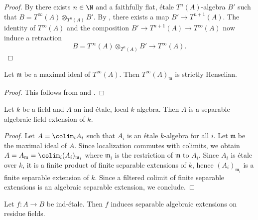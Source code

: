 \begin{proof}
    \leanok
    By 
    there exists $n \in \N$ and a faithfully flat, étale $T^n(A)$-algebra $B'$ such that
    $B = T^{\infty}(A) \otimes_{T^n(A)} B'$. By ,
    there exists a map $B' \to T^{n+1}(A)$. The identity of $T^{\infty}(A)$ and the composition
    $B' \to T^{n+1}(A) \to T^{\infty}(A)$ now induce a retraction
    \[
    B = T^{\infty}(A) \otimes_{T^n(A)} B' \to T^{\infty}(A)
    .\]
\end{proof}

\begin{corollary}
    Let $\mathfrak{m}$ be a maximal ideal of $T^{\infty}(A)$. Then $T^{\infty}(A)_{\mathfrak{m}}$
    is strictly Henselian.
    \label{cor:strictly-henselian-etale-contraction}
\end{corollary}

\begin{proof}
    This follows from  and .
\end{proof}

\begin{lemma}
    Let $k$ be a field and $A$ an ind-étale, local $k$-algebra. Then $A$ is
    a separable algebraic field extension of $k$.
    \label{lemma:field-local-ind-etale}
    \leanok
\end{lemma}

\begin{proof}
    \leanok
    Let $A = \colim_i A_i$ such that $A_i$ is an étale $k$-algebra for all $i$.
    Let $\mathfrak{m}$ be the maximal ideal of $A$. Since localization commutes with colimits,
    we obtain $A = A_{\mathfrak{m}} = \colim_i (A_i)_{\mathfrak{m}_i}$ where
    $\mathfrak{m}_i$ is the restriction of $\mathfrak{m}$ to $A_i$. Since $A_i$ is étale over $k$,
    it is a finite product of finite separable extensions of $k$, hence $(A_i)_{\mathfrak{m}_i}$
    is a finite separable extension of $k$. Since a filtered colimit of finite separable
    extensions is an algebraic separable extension, we conclude.
\end{proof}

\begin{proposition}
    Let $f\colon A \to B$ be ind-étale. Then $f$ induces separable algebraic 
    extensions on residue fields.
    \label{prop:ind-etale-residue-fields}
    \leanok
\end{proposition}

